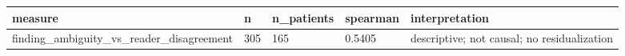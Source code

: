\begin{tabular}{lllll}
\hline
measure & n & n\_patients & spearman & interpretation \\
\hline
finding\_ambiguity\_vs\_reader\_disagreement & 305 & 165 & 0.5405 & descriptive; not causal; no residualization \\
\hline
\end{tabular}
